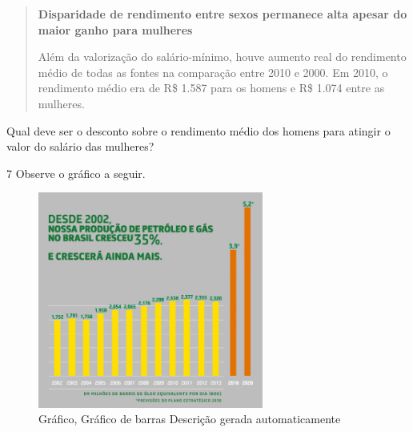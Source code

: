 \begin{escolha}
\begin{boxmedio}
\begin{boxmedio}
{\begin{boxpeq}
\begin{boxpeq}
{\begin{boxpeq}
\begin{boxmedio}
\begin{boxmedio}
\begin{boxpeq}
\begin{quote}

\textbf{Disparidade de rendimento entre sexos permanece alta
apesar do maior ganho para mulheres}

Além da valorização do salário-mínimo, houve aumento real do rendimento
médio de todas as fontes na comparação entre 2010 e 2000. Em 2010, o
rendimento médio era de R\$ 1.587 para os homens e R\$ 1.074 entre as
mulheres.

\end{quote}


Qual deve ser o desconto sobre o rendimento médio dos homens para
atingir o valor do salário das mulheres?

\begin{boxmedio}

\num{7} Observe o gráfico a seguir. 

\begin{figure}
\centering
\includegraphics[width=2.91782in,height=2.79636in]{./_SAEB_9_MAT/media/image64.jpg}
\caption{Gráfico, Gráfico de barras Descrição gerada automaticamente}
\end{figure}



\end{boxmedio}
\end{boxpeq}
\end{boxmedio}
\end{boxmedio}
\end{boxpeq}}
\end{boxpeq}
\end{boxpeq}}
\end{boxmedio}
\end{boxmedio}
\end{escolha}
